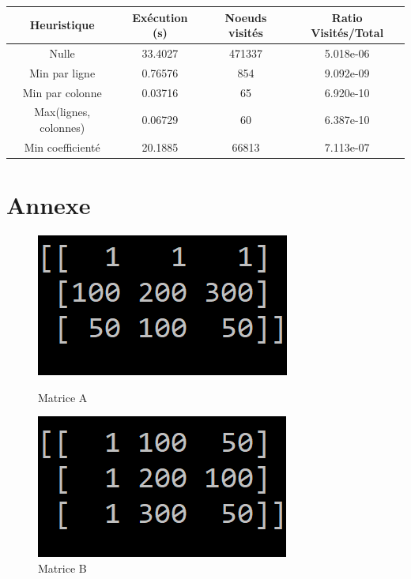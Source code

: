\documentclass[11pt]{article} %
\begin{document}
\begin{center}
    \begin{tabular}{|c|c|c|c|}
        \hline
        \textbf{Heuristique} & \textbf{Exécution (s)} & \textbf{Noeuds visités} & \textbf{Ratio Visités/Total} \\ \hline
        Nulle &   33.4027   &  471337   &  5.018e-06 \\ \hline
        Min par ligne &   0.76576   &  854   &  9.092e-09 \\ \hline
        Min par colonne &   0.03716   &  65   &  6.920e-10 \\ \hline
        Max(lignes, colonnes) &   0.06729   &  60   &  6.387e-10 \\ \hline
        Min coefficienté &   20.1885   &  66813   &  7.113e-07 \\ \hline
    \end{tabular}
\end{center}

\newpage

\section{Annexe}

\begin{figure}[!htb]
   \begin{minipage}{0.48\textwidth}
     \centering
     \includegraphics[width=.9\linewidth]{A.png}
     \caption{Matrice A}
   \end{minipage}\hfill
   \begin {minipage}{0.48\textwidth}
     \centering
     \includegraphics[width=.9\linewidth]{B.png}
     \caption{Matrice B}
   \end{minipage}
\end{figure}
\end{document}
